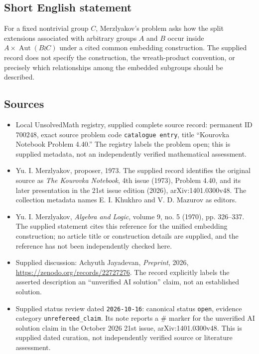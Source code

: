\documentclass[11pt]{article}
\begin{document}
\subsection{Short English statement}
For a fixed nontrivial group \(C\), Merzlyakov's problem asks how the split extensions associated with arbitrary groups \(A\) and \(B\) occur inside \(A\times\operatorname{Aut}(B\wr C)\) under a cited common embedding construction. The supplied record does not specify the construction, the wreath-product convention, or precisely which relationships among the embedded subgroups should be described.
\subsection{Sources}
\begin{itemize}
\item Local UnsolvedMath registry, supplied complete source record: permanent ID \(700248\), exact source problem code \texttt{catalogue entry}, title ``Kourovka Notebook Problem 4.40.'' The registry labels the problem open; this is supplied metadata, not an independently verified mathematical assessment.
\item Yu. I. Merzlyakov, proposer, 1973. The supplied record identifies the original source as \emph{The Kourovka Notebook}, 4th issue (1973), Problem 4.40, and its later presentation in the 21st issue edition (2026), arXiv:1401.0300v48. The collection metadata names E. I. Khukhro and V. D. Mazurov as editors.
\item Yu. I. Merzlyakov, \emph{Algebra and Logic}, volume 9, no. 5 (1970), pp. 326--337. The supplied statement cites this reference for the unified embedding construction; no article title or construction details are supplied, and the reference has not been independently checked here.
\item Supplied discussion: Achyuth Jayadevan, \emph{Preprint}, 2026, \url{https://zenodo.org/records/22727276}. The record explicitly labels the asserted description an ``unverified AI solution'' claim, not an established solution.
\item Supplied status review dated \texttt{2026-10-16}: canonical status \texttt{open}, evidence category \texttt{unrefereed\_claim}. Its note reports a \(\#\) marker for the unverified AI solution claim in the October 2026 21st issue, arXiv:1401.0300v48. This is supplied dated curation, not independently verified source or literature assessment.
\end{itemize}
\end{document}
